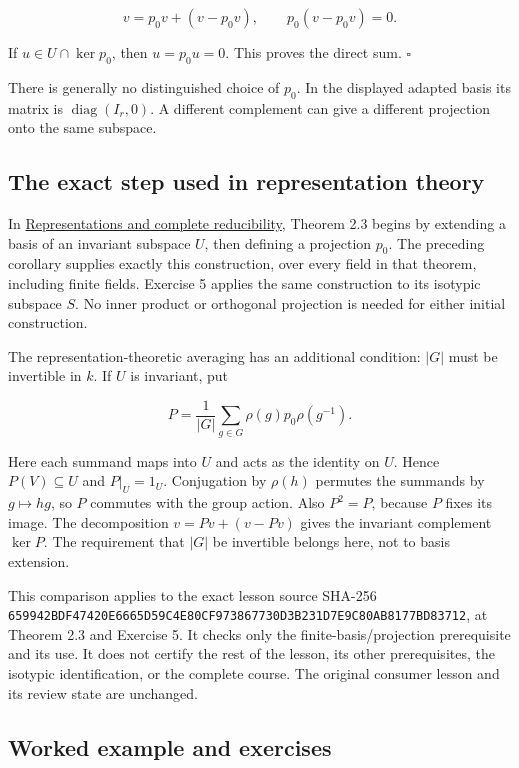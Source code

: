 \documentclass[
  english,
]{article}
\begin{document}
\[
v=p_0v+(v-p_0v),\qquad p_0(v-p_0v)=0.
\]

If \(u\in U\cap\ker p_0\), then \(u=p_0u=0\). This proves the direct
sum. \(\square\)

There is generally no distinguished choice of \(p_0\). In the displayed
adapted basis its matrix is \(\operatorname{diag}(I_r,0)\). A different
complement can give a different projection onto the same subspace.

\subsection{The exact step used in representation
theory}\label{the-exact-step-used-in-representation-theory}

In
\href{https://kokunoyumeto.github.io/open-mathematics-courses/courses/RT-FIN/representations-and-complete-reducibility.html}{Representations
and complete reducibility}, Theorem 2.3 begins by extending a basis of
an invariant subspace \(U\), then defining a projection \(p_0\). The
preceding corollary supplies exactly this construction, over every field
in that theorem, including finite fields. Exercise 5 applies the same
construction to its isotypic subspace \(S\). No inner product or
orthogonal projection is needed for either initial construction.

The representation-theoretic averaging has an additional condition:
\(|G|\) must be invertible in \(k\). If \(U\) is invariant, put

\[
P=\frac{1}{|G|}\sum_{g\in G}\rho(g)p_0\rho(g^{-1}).
\]

Here each summand maps into \(U\) and acts as the identity on \(U\).
Hence \(P(V)\subseteq U\) and \(P|_U=1_U\). Conjugation by \(\rho(h)\)
permutes the summands by \(g\mapsto hg\), so \(P\) commutes with the
group action. Also \(P^2=P\), because \(P\) fixes its image. The
decomposition \(v=Pv+(v-Pv)\) gives the invariant complement \(\ker P\).
The requirement that \(|G|\) be invertible belongs here, not to basis
extension.

This comparison applies to the exact lesson source SHA-256
\texttt{659942BDF47420E6665D59C4E80CF973867730D3B231D7E9C80AB8177BD83712},
at Theorem 2.3 and Exercise 5. It checks only the
finite-basis/projection prerequisite and its use. It does not certify
the rest of the lesson, its other prerequisites, the isotypic
identification, or the complete course. The original consumer lesson and
its review state are unchanged.

\subsection{Worked example and
exercises}\label{worked-example-and-exercises}
\end{document}
